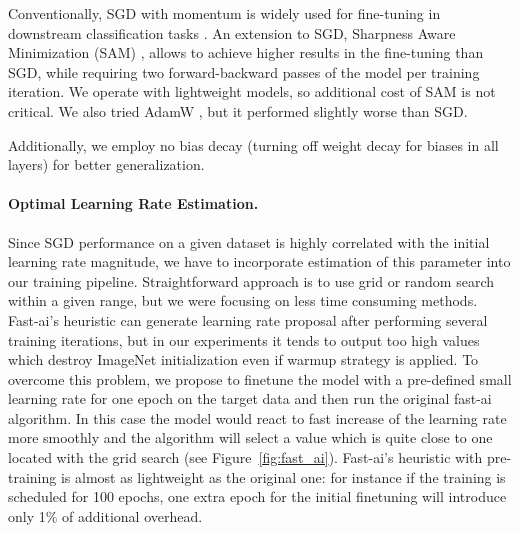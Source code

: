 \documentclass[runningheads]{llncs}
\begin{document}
Conventionally, SGD with momentum is widely used for fine-tuning in downstream classification tasks \cite{Zhai2021ScalingVT, Pham2020MetaPL}.
An extension to SGD, Sharpness Aware Minimization (SAM) \cite{Foret2020SharpnessAwareMF}, allows to achieve higher results in
the fine-tuning than SGD, while requiring two forward-backward passes of the model per training iteration. We operate with lightweight models,
so additional cost of SAM is not critical. We also tried AdamW \cite{Kingma2015AdamAM}, but it performed slightly worse than SGD.

Additionally, we employ no bias decay (turning off weight decay for biases in all layers) \cite{bagOfTricks} for better generalization.

\paragraph{Optimal Learning Rate Estimation.}

Since SGD performance on a given dataset is highly correlated with the initial learning rate magnitude, we have to
incorporate estimation of this parameter into our training pipeline. Straightforward approach is to use grid or random search
within a given range, but we were focusing on less time consuming methods. Fast-ai's heuristic \cite{fastai} can generate
learning rate proposal after performing several training iterations, but in our experiments it tends to output too high
values which destroy ImageNet initialization even if warmup strategy is applied. To overcome this problem, we propose to finetune
the model with a pre-defined small learning rate for one epoch on the target data and then run the original fast-ai algorithm.
In this case the model would react to fast increase of the learning rate more smoothly and the algorithm will select a value
which is quite close to one located with the grid search (see Figure~\ref{fig:fast_ai}). Fast-ai's heuristic with pre-training is
almost as lightweight as the original one: for instance if the training is scheduled for 100 epochs,
one extra epoch for the initial finetuning will introduce only 1\% of additional overhead.
\end{document}
